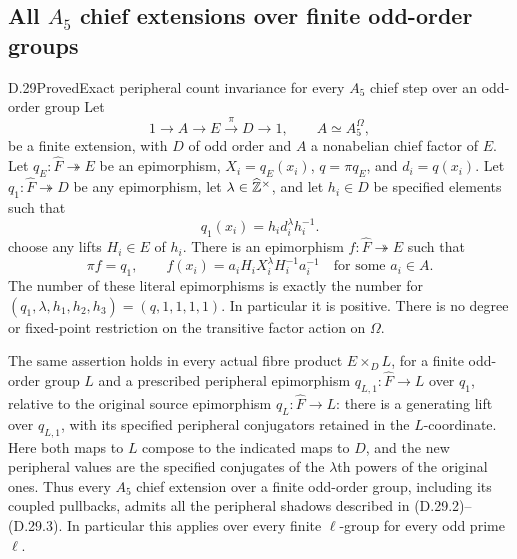 \subsection{All \texorpdfstring{$A_5$}{A5} chief extensions over finite odd-order groups}

\begin{statement}{D.29}{Proved}{Exact peripheral count invariance for every $A_5$ chief step over an odd-order group}
Let
\[
 1\longrightarrow A\longrightarrow E\xrightarrow{\pi}D
 \longrightarrow1,
 \qquad A\simeq A_5^{\Omega},
 \tag{D.29.1}
\]
be a finite extension, with $D$ of odd order and $A$ a
nonabelian chief factor of $E$.  Let
$q_E:\widehat F\twoheadrightarrow E$ be an epimorphism,
$X_i=q_E(x_i)$, $q=\pi q_E$, and $d_i=q(x_i)$.
Let $q_1:\widehat F\twoheadrightarrow D$ be any
epimorphism, let $\lambda\in\widehat{\mathbb Z}^\times$, and
let $h_i\in D$ be specified elements such that
\[
           q_1(x_i)=h_i d_i^\lambda h_i^{-1}.
 \tag{D.29.2}
\]
choose any lifts $H_i\in E$ of $h_i$.
There is an epimorphism $f:\widehat F\twoheadrightarrow E$
such that
\[
 \pi f=q_1,
 \qquad
 f(x_i)=a_iH_iX_i^\lambda H_i^{-1}a_i^{-1}
              \quad\text{for some }a_i\in A.
 \tag{D.29.3}
\]
The number of these literal epimorphisms is exactly the
number for $(q_1,\lambda,h_1,h_2,h_3)=(q,1,1,1,1)$.
In particular it is positive.  There is no degree or
fixed-point restriction on the transitive factor action
on $\Omega$.

The same assertion holds in every actual fibre product
$E\times_D L$, for a finite odd-order group $L$ and a
prescribed peripheral epimorphism $q_{L,1}:\widehat F\to L$
over $q_1$, relative to the original source epimorphism
$q_L:\widehat F\to L$: there is a generating lift over
$q_{L,1}$, with its specified peripheral conjugators
retained in the $L$-coordinate.  Here both maps to $L$
compose to the indicated maps to $D$, and the new
peripheral values are the specified conjugates of the
$\lambda$th powers of the original ones.
Thus every $A_5$ chief extension over a
finite odd-order group, including its coupled pullbacks, admits
all the peripheral shadows described in
\textup{(D.29.2)--(D.29.3)}.
In particular this applies over every finite $\ell$-group
for every odd prime $\ell$.
\end{statement}

